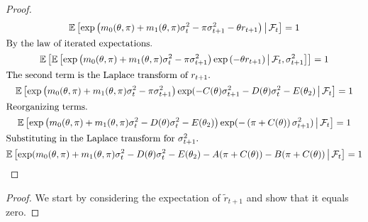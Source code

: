 \documentclass[11pt, letterpaper, twoside, final]{article}
\begin{document}
\begin{appendices}
\begin{proof}
\begin{gather}
  \E\left[\exp\left(m_0(\theta, \pi) + m_1(\theta, \pi) \sigma^2_t - \pi \sigma^2_{t+1} - \theta r_{t+1}
  \right) \mvert \F_t \right] = 1 \\
%
  \intertext{By the law of iterated expectations.}
%
  \E\left[ \E\left[\exp\left(m_0(\theta, \pi) + m_1(\theta, \pi) \sigma^2_t - \pi \sigma^2_{t+1}\right)
    \exp\left( - \theta r_{t+1}\right) \mvert \F_t, \sigma^2_{t+1} \right]\right] = 1 \\
%
  \intertext{The second term is the Laplace transform of $r_{t+1}$.}
%
  \E\left[\exp\left(m_0(\theta, \pi) + m_1(\theta, \pi) \sigma^2_t - \pi \sigma^2_{t+1} \right)
    \exp(-C(\theta) \sigma^2_{t+1} - D(\theta) \sigma^2_{t} - E(\theta_2) \mvert \F_t \right] = 1 \\
%
  \intertext{Reorganizing terms.}
%
  \E\left[\exp\left(m_0(\theta, \pi) + m_1(\theta, \pi) \sigma^2_t - D(\theta) \sigma^2_{t} - E(\theta_2)
  \right) \exp(-\left(\pi + C(\theta)\right) \sigma^2_{t+1}) \mvert \F_t \right] = 1 \\ 
%
  \intertext{Substituting in the Laplace transform for $\sigma^2_{t+1}$.} 
%
  \label{eqn:expected_sdf_wrt_PP}
  \E\left[\exp(m_0(\theta, \pi) + m_1(\theta, \pi) \sigma^2_t - D(\theta) \sigma^2_{t} - E(\theta_2) - A(\pi +
  C(\theta)) - B(\pi + C(\theta)) \mvert \F_t \right] = 1 
\end{gather}

\end{proof}

\leverageVersusMeasureChange*


\begin{proof}

  We start by considering the expectation of $\widetilde{r}_{t+1}$ and show that it equals zero.


\end{proof}
\end{appendices}
\end{document}
